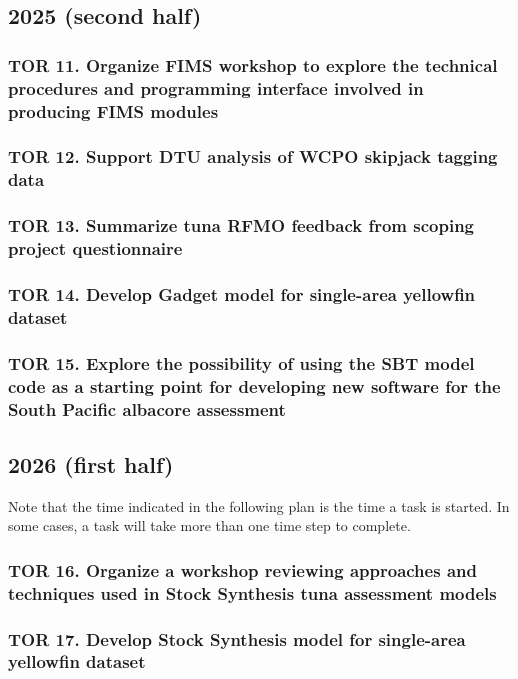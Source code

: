 \documentclass{SCreport}
\begin{document}
\subsection{2025 (second half)}

\subsubsection{TOR 11. Organize FIMS workshop to explore the technical
  procedures and programming interface involved in producing FIMS modules}

\subsubsection{TOR 12. Support DTU analysis of WCPO skipjack tagging data}

\subsubsection{TOR 13. Summarize tuna RFMO feedback from scoping project
  questionnaire}

\subsubsection{TOR 14. Develop Gadget model for single-area yellowfin dataset}

\subsubsection{TOR 15. Explore the possibility of using the SBT model code as a
  starting point for developing new software for the South Pacific albacore
  assessment}

\subsection{2026 (first half)}

Note that the time indicated in the following plan is the time a task is
started. In some cases, a task will take more than one time step to complete.

\subsubsection{TOR 16. Organize a workshop reviewing approaches and techniques
  used in Stock Synthesis tuna assessment models}

\subsubsection{TOR 17. Develop Stock Synthesis model for single-area yellowfin
  dataset}
\end{document}
